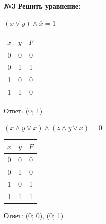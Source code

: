     \begin{center}\end{center}


    \begin{center}
        \textbf{№3 Решить уравнение:}
    \end{center}

    \begin{minipage}[t]{0.3\textwidth}
        \centering
        \begin{enumerate}
            \setcounter{enumi}{0}
            \begin{spacing}{1.2}
                \item $(x \vee y) \wedge \overline x = 1$\\
            \end{spacing}
            \begin{tabular}{|c|c|c|}
                \hline
                $x$ & $y$ & $F$ \\
                \hline
                0   & 0   & 0   \\
                \hline
                0   & 1   & 1   \\
                \hline
                1   & 0   & 0   \\
                \hline
                1   & 1   & 0   \\
                \hline
            \end{tabular}
        \end{enumerate}
        Ответ: (0; 1)
    \end{minipage}
    \begin{minipage}[t]{0.4\textwidth}
        \centering
        \begin{enumerate}
            \setcounter{enumi}{1}
            \begin{spacing}{1.2}
                \item $(x \wedge y \vee x) \wedge (\overline z \wedge y \vee x) = 0$\\
            \end{spacing}
            \begin{tabular}{|c|c|c|}
                \hline
                $x$ & $y$ & $F$ \\
                \hline
                0   & 0   & 0   \\
                \hline
                0   & 1   & 0   \\
                \hline
                1   & 0   & 1   \\
                \hline
                1   & 1   & 1   \\
                \hline
            \end{tabular}
        \end{enumerate}
        Ответ: (0; 0), (0; 1)
    \end{minipage}
